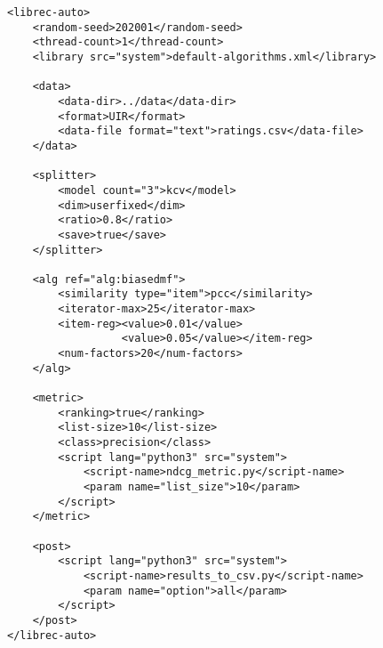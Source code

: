 \small{
\begin{verbatim}
<librec-auto>
    <random-seed>202001</random-seed>
    <thread-count>1</thread-count>
    <library src="system">default-algorithms.xml</library>
	
	<data>
        <data-dir>../data</data-dir>
        <format>UIR</format>
        <data-file format="text">ratings.csv</data-file>
	</data>
	
	<splitter>
        <model count="3">kcv</model>
        <dim>userfixed</dim>
        <ratio>0.8</ratio>
        <save>true</save>
	</splitter>
	
	<alg ref="alg:biasedmf">
        <similarity type="item">pcc</similarity>
        <iterator-max>25</iterator-max>
        <item-reg><value>0.01</value>
                  <value>0.05</value></item-reg>
        <num-factors>20</num-factors>
	</alg>

	<metric>
        <ranking>true</ranking>
        <list-size>10</list-size>
        <class>precision</class>
        <script lang="python3" src="system">
            <script-name>ndcg_metric.py</script-name>
            <param name="list_size">10</param>
        </script>
	</metric>
	
	<post>
        <script lang="python3" src="system">
            <script-name>results_to_csv.py</script-name>
            <param name="option">all</param>
        </script> 
	</post>
</librec-auto>
\end{verbatim}
}
